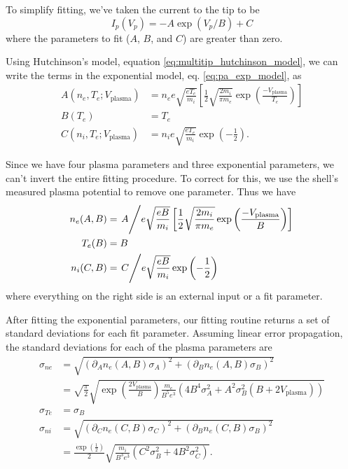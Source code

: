 
To simplify fitting, we've taken the current to the tip to be
\begin{equation}
    I_p(V_p) = -A \exp(V_p / B) + C
    \label{eq:pa_exp_model}
\end{equation}
where the parameters to fit ($A$, $B$, and $C$) are greater than zero.


Using Hutchinson's model, equation \ref{eq:multitip_hutchinson_model}, we can write the terms in the exponential model, eq. \ref{eq:pa_exp_model}, as
\begin{align}
    A(n_e, T_e; V_\text{plasma}) &= n_e e \sqrt{\frac{e T_e}{m_i}} \left[\frac{1}{2} \sqrt{\frac{2 m_i}{\pi m_e}} \exp\left(\frac{- V_\text{plasma}}{T_e}\right)\right] \label{eq:pa_plasma_to_exp_params_A}\\
    B(T_e) &= T_e \\
    C(n_i, T_e; V_\text{plasma}) &= n_i e \sqrt{\frac{e T_e}{m_i}} \exp\left(-\frac{1}{2}\right).
\end{align}


Since we have four plasma parameters and three exponential parameters, we can't invert the entire fitting procedure. To correct for this, we use the shell's measured plasma potential to remove one parameter. Thus we have
\begin{align}
    n_e(A, B) &= \left. A \middle/ e \sqrt{\frac{e B}{m_i}} \left[\frac{1}{2} \sqrt{\frac{2 m_i}{\pi m_e}} \exp\left(\frac{- V_\text{plasma}}{B}\right)\right] \right. \\
    T_e(B) &= B \\
    n_i(C, B) &= \left. C \middle/ e \sqrt{\frac{e B}{m_i}} \exp\left(-\frac{1}{2}\right) \right.
\end{align}
where everything on the right side is an external input or a fit parameter.


After fitting the exponential parameters, our fitting routine returns a set of standard deviations for each fit parameter. Assuming linear error propagation, the standard deviations for each of the plasma parameters are
\begin{align}
    \sigma_{ne} &= \sqrt{(\partial_A n_e(A, B) \sigma_A)^2 + (\partial_B n_e(A, B) \sigma_B)^2} \nonumber \\
    &= \sqrt{\frac{\pi}{2}} \sqrt{\exp\left(\frac{2 V_\text{plasma}}{B}\right) \frac{m_e}{B^5 e^3} \left(4 B^4 \sigma_A^2 + A^2 \sigma_B^2 (B + 2 V_\text{plasma})\right)} \\
    \sigma_{Te} &= \sigma_B \\
    \sigma_{ni} &= \sqrt{(\partial_C n_e(C, B) \sigma_C)^2 + (\partial_B n_e(C, B) \sigma_B)^2} \nonumber \\
    &= \frac{\exp\left(\frac{1}{2}\right)}{2}\sqrt{\frac{m_i}{B^3 e^3} \left(C^2 \sigma_B^2 + 4 B^2 \sigma_C^2\right)}.
\end{align}

